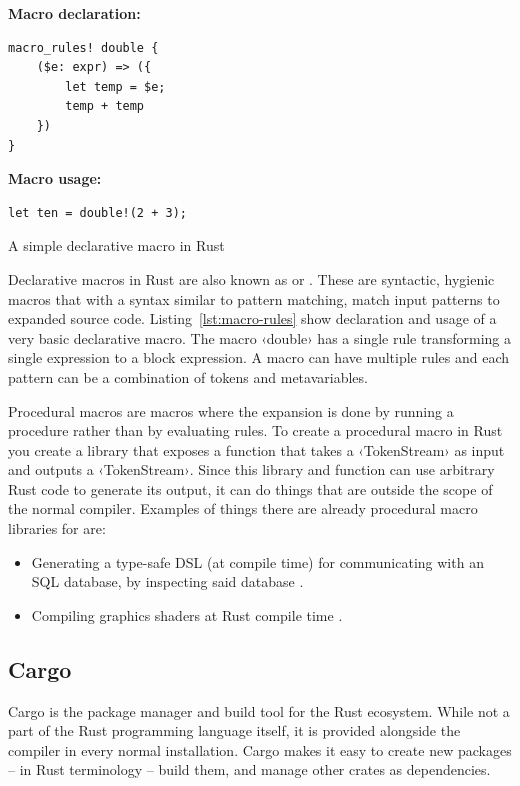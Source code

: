 \begin{listing}[ht!]
\textbf{Macro declaration:}
\begin{verbatim}
macro_rules! double {
    ($e: expr) => ({
        let temp = $e;
        temp + temp
    })
}
\end{verbatim}
\vspace{5mm}

\textbf{Macro usage:}
\begin{verbatim}
let ten = double!(2 + 3);
\end{verbatim}
\caption{A simple declarative macro in Rust}
\label{lst:macro-rules}
\end{listing}

Declarative macros in Rust are also known as  or . These are syntactic, hygienic macros that with a syntax similar to pattern matching, match input patterns to expanded source code. Listing~\ref{lst:macro-rules} show declaration and usage of a very basic declarative macro. The macro ‹double› has a single rule transforming a single expression to a block expression. A macro can have multiple rules and each pattern can be a combination of tokens and metavariables.

Procedural macros are macros where the expansion is done by running a procedure rather than by evaluating rules. To create a procedural macro in Rust you create a library that exposes a function that takes a ‹TokenStream› as input and outputs a ‹TokenStream›. Since this library and function can use arbitrary Rust code to generate its output, it can do things that are outside the scope of the normal compiler. Examples of things there are already procedural macro libraries for are:

\begin{itemize}
  \item Generating a type-safe DSL (at compile time) for communicating with an SQL database, by inspecting said database \cite{diesel}.
  \item Compiling graphics shaders at Rust compile time \cite{vulkano}.
\end{itemize}


\subsection{Cargo}

Cargo is the package manager and build tool for the Rust ecosystem. While not a part of the Rust programming language itself, it is provided alongside the compiler in every normal installation. Cargo makes it easy to create new packages --  in Rust terminology -- build them, and manage other crates as dependencies.

